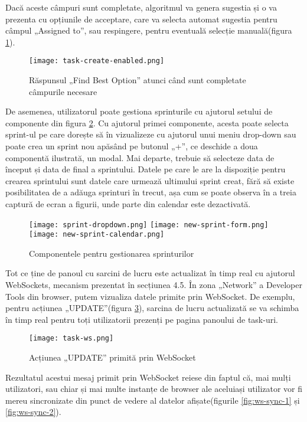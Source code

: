 Dacă aceste câmpuri sunt completate, algoritmul va genera sugestia și o va prezenta cu opțiunile de acceptare, care va selecta automat sugestia pentru câmpul „Assigned to”, sau respingere, pentru eventuală selecție manuală(figura \ref{fig:task-create-enabled}).

 \begin{figure}[H]
	\centering
 	 \texttt{[image: task-create-enabled.png]}
	\caption{Răspunsul „Find Best Option” atunci când sunt completate câmpurile necesare}
	\label{fig:task-create-enabled}
 \end{figure}

De asemenea, utilizatorul poate gestiona sprinturile cu ajutorul setului de componente din figura \ref{fig:new-sprint}. Cu ajutorul primei componente, acesta poate selecta sprint-ul pe care dorește să în vizualizeze cu ajutorul unui meniu drop-down sau poate crea un sprint nou apăsând pe butonul „+”, ce deschide a doua componentă ilustrată, un modal. Mai departe, trebuie să selecteze data de început și data de final a sprintului. Datele pe care le are la dispoziție pentru crearea sprintului sunt datele care urmează ultimului sprint creat, fără să existe posibilitatea de a adăuga sprinturi în trecut, așa cum se poate observa în a treia captură de ecran a figurii, unde parte din calendar este dezactivată.

 \begin{figure}[H]
	\centering
	\texttt{[image: sprint-dropdown.png]}
 	 \texttt{[image: new-sprint-form.png]}
	\texttt{[image: new-sprint-calendar.png]}
	\caption{Componentele pentru gestionarea sprinturilor}
	\label{fig:new-sprint}
 \end{figure}

Tot ce ține de panoul cu sarcini de lucru este actualizat în timp real cu ajutorul WebSockets, mecanism prezentat în secțiunea 4.5. În zona „Network” a Developer Tools din browser, putem vizualiza datele primite prin WebSocket. De exemplu, pentru acțiunea „UPDATE”(figura \ref{fig:task-ws}), sarcina de lucru actualizată se va schimba în timp real pentru toți utilizatorii prezenți pe pagina panoului de task-uri.

 \begin{figure}[H]
	\centering
 	 \texttt{[image: task-ws.png]}
	\caption{Acțiunea „UPDATE” primită prin WebSocket}
	\label{fig:task-ws}
 \end{figure}

Rezultatul acestui mesaj primit prin WebSocket reiese din faptul că, mai mulți utilizatori, sau chiar și mai multe instanțe de browser ale aceluiași utilizator vor fi mereu sincronizate din punct de vedere al datelor afișate(figurile \ref{fig:ws-sync-1} și \ref{fig:ws-sync-2}).

